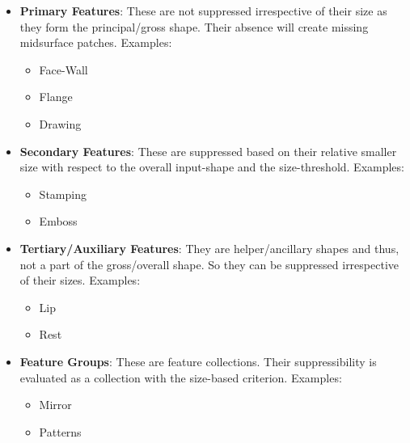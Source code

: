 \begin{itemize}
[noitemsep,topsep=2pt,parsep=2pt,partopsep=2pt]
\item \textbf{Primary Features}: These are not suppressed irrespective of their size as they form the principal/gross shape.  Their absence will create missing midsurface patches. Examples:
	\begin{itemize} [noitemsep,topsep=2pt,parsep=2pt,partopsep=2pt]
	\item Face-Wall
	\item Flange
	\item Drawing
	\end{itemize}
\item \textbf{Secondary Features}: These are suppressed based on their relative smaller size with respect to the overall input-shape and the size-threshold. 
 Examples:
	\begin{itemize} [noitemsep,topsep=2pt,parsep=2pt,partopsep=2pt]
	\item Stamping
	\item Emboss 
	\end{itemize}
	
\item \textbf{Tertiary/Auxiliary Features}: They are helper/ancillary shapes and thus, not a part of the gross/overall shape. So they can be suppressed irrespective of their sizes.
Examples:
	\begin{itemize} [noitemsep,topsep=2pt,parsep=2pt,partopsep=2pt]
	\item Lip
	\item Rest 
	\end{itemize}
	
		
\item \textbf{Feature Groups}: These are feature collections. Their suppressibility is evaluated as a collection with the size-based criterion. 	Examples:
\begin{itemize} [noitemsep,topsep=2pt,parsep=2pt,partopsep=2pt]
	\item Mirror
	\item Patterns
	\end{itemize}
\end{itemize}
